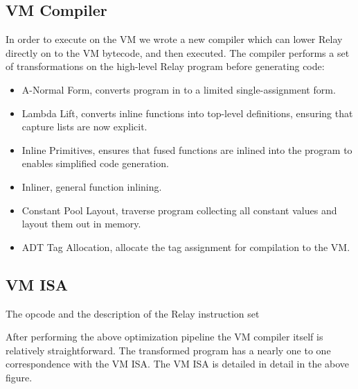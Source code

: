 \subsection{VM Compiler}


In order to execute on the VM we wrote a new compiler which
  can lower Relay directly on to the VM bytecode, and then
  executed.
The compiler performs a set of transformations on the high-level
  Relay program before generating code:
\begin{itemize}
  \item A-Normal Form, converts program in to a limited single-assignment form.
  \item Lambda Lift, converts inline functions into top-level definitions,
        ensuring that capture lists are now explicit.
  \item Inline Primitives, ensures that fused functions are inlined into
        the program to enables simplified code generation.
  \item Inliner, general function inlining.
  \item Constant Pool Layout, traverse program collecting all constant values
        and layout them out in memory.
  \item ADT Tag Allocation, allocate the tag assignment for compilation
        to the VM.
\end{itemize}

\subsection{VM ISA}

\begin{table*}[th]
\centering
\small

\caption{The opcode and the description of the Relay instruction set \label{tab:isa}}
\end{table*}

After performing the above optimization pipeline the VM compiler
  itself is relatively straightforward.
The transformed program has a nearly one to one correspondence
  with the VM ISA.
The VM ISA is detailed in detail in the above figure.


